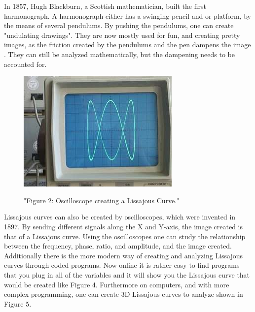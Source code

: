 In 1857, Hugh Blackburn, a Scottish mathematician, built the first harmonograph. A harmonograph either has a swinging pencil and or platform, by the means of several pendulums. By pushing the pendulums, one can create "undulating drawings". They are now mostly used for fun, and creating pretty images, as the friction created by the pendulums and the pen dampens the image \cite{Harmonograph}. They can still be analyzed mathematically, but the dampening needs to be accounted for.
\begin{figure}[h]
    \centering
    \includegraphics[scale=0.75]{Images/oscilloscope.jpg}\cite{Oscilloscope}
    \caption{"Figure 2: Oscilloscope creating a Lissajous Curve."}
    \label{fig:my_label}
\end{figure}


Lissajous curves can also be created by oscilloscopes, which were invented in 1897. By sending different signals along the X and Y-axis, the image created is that of a Lissajous curve. Using the oscilloscopes one can study the relationship between the frequency, phase, ratio, and amplitude, and the image created\cite{Oscilloscope}.
\newpage
Additionally there is the more modern way of creating and analyzing Lissajous curves through coded programs. Now online it is rather easy to find programs that you plug in all of the variables and it will show you the Lissajous curve that would be created like Figure 4. Furthermore on computers, and with more complex programming, one can create 3D Lissajous curves to analyze shown in Figure 5.

